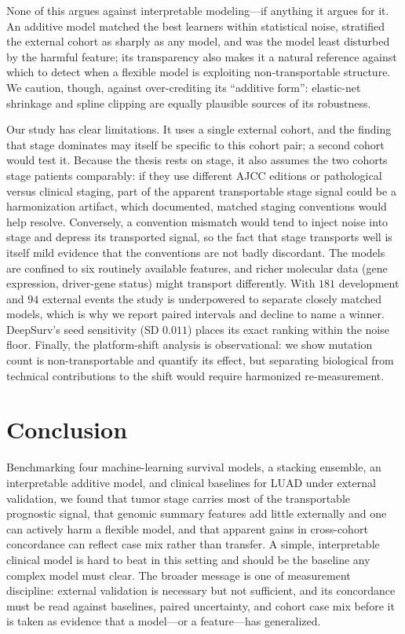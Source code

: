\documentclass[journal]{IEEEtran}
\begin{document}
None of this argues against interpretable modeling---if anything it argues for it.
An additive model matched the best learners within statistical noise, stratified
the external cohort as sharply as any model, and was the model least disturbed by
the harmful feature; its transparency also makes it a natural reference against
which to detect when a flexible model is exploiting non-transportable structure.
We caution, though, against over-crediting its ``additive form'': elastic-net
shrinkage and spline clipping are equally plausible sources of its robustness.

Our study has clear limitations. It uses a single external cohort, and the
finding that stage dominates may itself be specific to this cohort pair; a
second cohort would test it. Because the thesis rests on stage, it also assumes
the two cohorts stage patients comparably: if they use different AJCC editions
or pathological versus clinical staging, part of the apparent transportable
stage signal could be a harmonization artifact, which documented, matched
staging conventions would help resolve. Conversely, a convention mismatch would
tend to inject noise into stage and depress its transported signal, so the fact
that stage transports well is itself mild evidence that the conventions are not
badly discordant. The models are confined to six routinely available
features, and richer molecular data (gene expression, driver-gene status) might
transport differently. With $181$ development and $94$ external events the study
is underpowered to separate closely matched models, which is why we report
paired intervals and decline to name a winner. DeepSurv's seed sensitivity
(SD $0.011$) places its exact ranking within the noise floor. Finally, the
platform-shift analysis is observational: we show mutation count is
non-transportable and quantify its effect, but separating biological from
technical contributions to the shift would require harmonized re-measurement.

\section{Conclusion}
Benchmarking four machine-learning survival models, a stacking ensemble, an
interpretable additive model, and clinical baselines for LUAD under external
validation, we found that tumor stage carries most of the transportable
prognostic signal, that genomic summary features add little externally and one
can actively harm a flexible model, and that apparent gains in cross-cohort
concordance can reflect case mix rather than transfer. A simple, interpretable
clinical model is hard to beat in this setting and should be the baseline any
complex model must clear. The broader message is one of measurement discipline:
external validation is necessary but not sufficient, and its concordance must be
read against baselines, paired uncertainty, and cohort case mix before it is
taken as evidence that a model---or a feature---has generalized.
\end{document}
